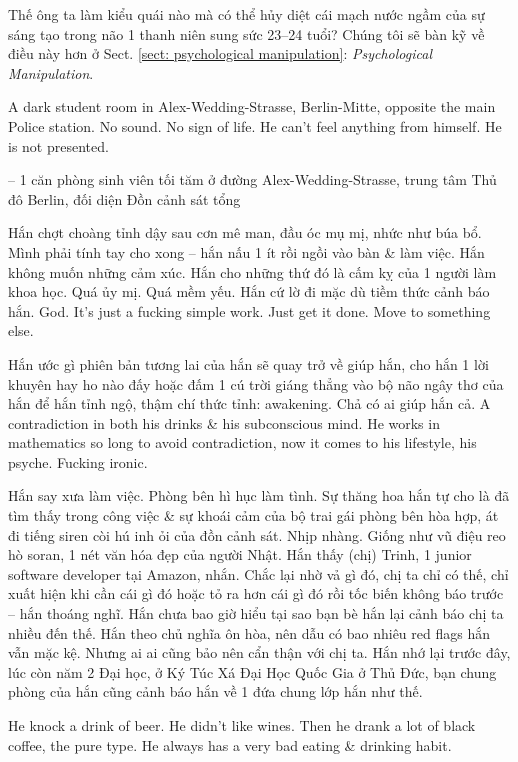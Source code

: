 \documentclass[12pt,twoside]{book}
\begin{document}
Thế ông ta làm kiểu quái nào mà có thể hủy diệt cái mạch nước ngầm của sự sáng tạo trong não 1 thanh niên sung sức 23--24 tuổi? Chúng tôi sẽ bàn kỹ về điều này hơn ở Sect. \ref{sect: psychological manipulation}: {\it Psychological Manipulation}.

A dark student room in Alex-Wedding-Strasse, Berlin-Mitte, opposite the main Police station. No sound. No sign of life. He can't feel anything from himself. He is not presented.

-- 1 căn phòng sinh viên tối tăm ở đường Alex-Wedding-Strasse, trung tâm Thủ đô Berlin, đối diện Đồn cảnh sát tổng 

Hắn chợt choàng tỉnh dậy sau cơn mê man, đầu óc mụ mị, nhức như búa bổ. Mình phải tính tay cho xong -- hắn nấu 1 ít rồi ngồi vào bàn \& làm việc. Hắn không muốn những cảm xúc. Hắn cho những thứ đó là cấm kỵ của 1 người làm khoa học. Quá ủy mị. Quá mềm yếu. Hắn cứ lờ đi mặc dù tiềm thức cảnh báo hắn. God. It's just a fucking simple work. Just get it done. Move to something else.

Hắn ước gì phiên bản tương lai của hắn sẽ quay trở về giúp hắn, cho hắn 1 lời khuyên hay ho nào đấy hoặc đấm 1 cú trời giáng thẳng vào bộ não ngây thơ của hắn để hắn tỉnh ngộ, thậm chí thức tỉnh: awakening. Chả có ai giúp hắn cả. A contradiction in both his drinks \& his subconscious mind. He works in mathematics so long to avoid contradiction, now it comes to his lifestyle, his psyche. Fucking ironic.

Hắn say xưa làm việc. Phòng bên hì hục làm tình. Sự thăng hoa hắn tự cho là đã tìm thấy trong công việc \& sự khoái cảm của bộ trai gái phòng bên hòa hợp, át đi tiếng siren còi hú inh ỏi của đồn cảnh sát. Nhịp nhàng. Giống như vũ điệu reo hò soran, 1 nét văn hóa đẹp của người Nhật. Hắn thấy (chị) Trinh, 1 junior software developer tại Amazon, nhắn. Chắc lại nhờ vả gì đó, chị ta chỉ có thế, chỉ xuất hiện khi cần cái gì đó hoặc tỏ ra hơn cái gì đó rồi tốc biến không báo trước -- hắn thoáng nghĩ. Hắn chưa bao giờ hiểu tại sao bạn bè hắn lại cảnh báo chị ta nhiều đến thế. Hắn theo chủ nghĩa ôn hòa, nên dẫu có bao nhiêu red flags hắn vẫn mặc kệ. Nhưng ai ai cũng bảo nên cẩn thận với chị ta. Hắn nhớ lại trước đây, lúc còn năm 2 Đại học, ở Ký Túc Xá Đại Học Quốc Gia ở Thủ Đức, bạn chung phòng của hắn cũng cảnh báo hắn về 1 đứa chung lớp hắn như thế.

He knock a drink of beer. He didn't like wines. Then he drank a lot of black coffee, the pure type. He always has a very bad eating \& drinking habit.
\end{document}

